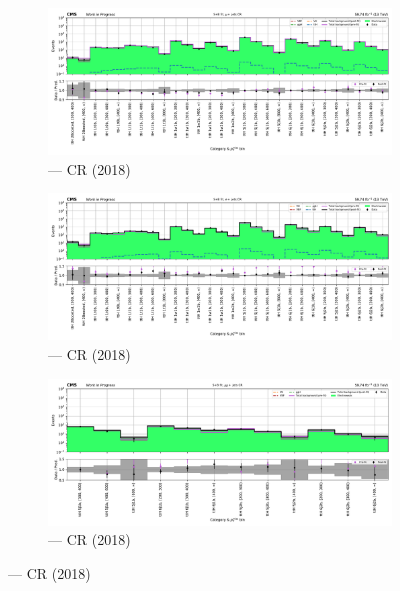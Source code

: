\begin{figure}[htbp]
    \centering
    \begin{subfigure}[b]{0.66\textwidth}
        \includegraphics[width=\textwidth]{chapters/higgstoinv/figures/mountain_ranges/2018/ttH/Wmunu_tree_fit_s-abs_values_ttH_cats.pdf}
        \caption{\ttH --- \singleMuCr \gls{CR} (2018)}
    \end{subfigure}

    \begin{subfigure}[b]{0.66\textwidth}
        \includegraphics[width=\textwidth]{chapters/higgstoinv/figures/mountain_ranges/2018/ttH/Wenu_tree_fit_s-abs_values_ttH_cats.pdf}
        \caption{\ttH --- \singleEleCr \gls{CR} (2018)}
    \end{subfigure}

    \begin{subfigure}[b]{0.66\textwidth}
        \includegraphics[width=\textwidth]{chapters/higgstoinv/figures/mountain_ranges/2018/ttH/Zmumu_tree_fit_s-abs_values_ttH_cats.pdf}
        \caption{\ttH --- \doubleMuCr \gls{CR} (2018)}
    \end{subfigure}


\end{figure}
